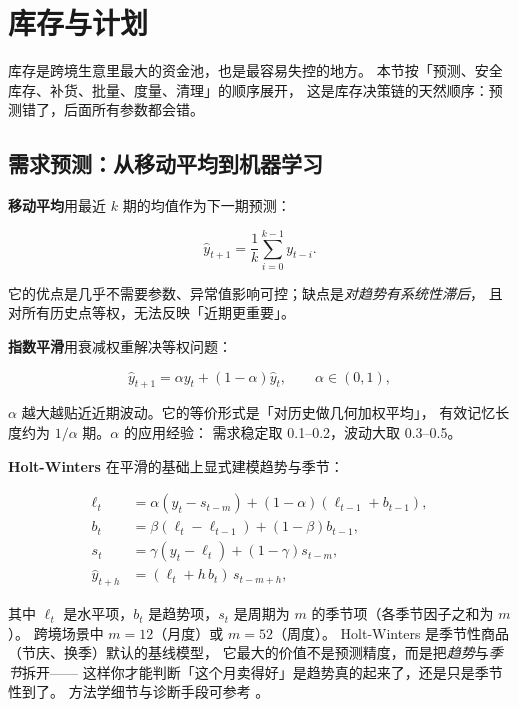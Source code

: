 \section{库存与计划}
\label{sec:sup-inventory}

库存是跨境生意里最大的资金池，也是最容易失控的地方。
本节按「预测、安全库存、补货、批量、度量、清理」的顺序展开，
这是库存决策链的天然顺序：预测错了，后面所有参数都会错。

\subsection{需求预测：从移动平均到机器学习}

\textbf{移动平均}用最近 $k$ 期的均值作为下一期预测：

\begin{equation}
\hat{y}_{t+1} = \frac{1}{k}\sum_{i=0}^{k-1} y_{t-i} .
\label{eq:ma}
\end{equation}

它的优点是几乎不需要参数、异常值影响可控；缺点是\emph{对趋势有系统性滞后}，
且对所有历史点等权，无法反映「近期更重要」。

\textbf{指数平滑}用衰减权重解决等权问题：

\begin{equation}
\hat{y}_{t+1} = \alpha y_t + (1-\alpha)\hat{y}_t, \qquad \alpha \in (0,1),
\label{eq:ses}
\end{equation}

$\alpha$ 越大越贴近近期波动。它的等价形式是「对历史做几何加权平均」，
有效记忆长度约为 $1/\alpha$ 期。$\alpha$ 的应用经验：
需求稳定取 0.1--0.2，波动大取 0.3--0.5。

\textbf{Holt-Winters} 在平滑的基础上显式建模趋势与季节：

\begin{equation}
\begin{aligned}
\ell_t &= \alpha (y_t - s_{t-m}) + (1-\alpha)(\ell_{t-1} + b_{t-1}), \\
b_t &= \beta(\ell_t - \ell_{t-1}) + (1-\beta) b_{t-1}, \\
s_t &= \gamma (y_t - \ell_t) + (1-\gamma) s_{t-m}, \\
\hat{y}_{t+h} &= (\ell_t + h\,b_t)\, s_{t-m+h},
\end{aligned}
\label{eq:holtwinters}
\end{equation}

其中 $\ell_t$ 是水平项，$b_t$ 是趋势项，$s_t$ 是周期为 $m$ 的季节项（各季节因子之和为 $m$）。
跨境场景中 $m = 12$（月度）或 $m = 52$（周度）。
Holt-Winters 是季节性商品（节庆、换季）默认的基线模型，
它最大的价值不是预测精度，而是把\emph{趋势}与\emph{季节}拆开——
这样你才能判断「这个月卖得好」是趋势真的起来了，还是只是季节性到了。
方法学细节与诊断手段可参考 \cite{hyndman2021forecasting}。

